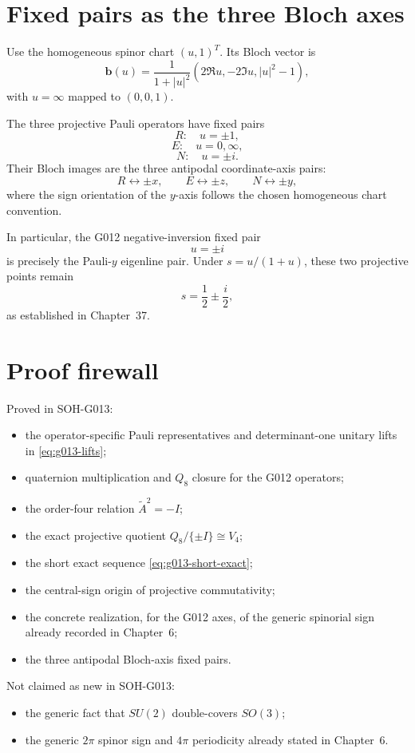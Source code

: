\section{Fixed pairs as the three Bloch axes}

Use the homogeneous spinor chart \((u,1)^T\).  Its Bloch vector is
\[
 \mathbf b(u)
 =\frac{1}{1+|u|^2}
 \left(
 2\Re u,
 -2\Im u,
 |u|^2-1
 \right),
\]
with \(u=\infty\) mapped to \((0,0,1)\).

The three projective Pauli operators have fixed pairs
\[
 R:\quad u=\pm1,
\]
\[
 E:\quad u=0,\infty,
\]
\[
 N:\quad u=\pm i.
\]
Their Bloch images are the three antipodal coordinate-axis pairs:
\[
 R\leftrightarrow\pm x,
 \qquad
 E\leftrightarrow\pm z,
 \qquad
 N\leftrightarrow\pm y,
\]
where the sign orientation of the \(y\)-axis follows the chosen homogeneous
chart convention.

In particular, the G012 negative-inversion fixed pair
\[
 u=\pm i
\]
is precisely the Pauli-\(y\) eigenline pair.  Under
\(s=u/(1+u)\), these two projective points remain
\[
 \boxed{s=\frac12\pm\frac{i}{2}},
\]
as established in Chapter~37.

\section{Proof firewall}

Proved in SOH-G013:
\begin{itemize}
 \item the operator-specific Pauli representatives and determinant-one unitary
       lifts in \cref{eq:g013-lifts};
 \item quaternion multiplication and \(Q_8\) closure for the G012 operators;
 \item the order-four relation \(\widetilde A^2=-I\);
 \item the exact projective quotient
       \(Q_8/\{\pm I\}\cong V_4\);
 \item the short exact sequence \cref{eq:g013-short-exact};
 \item the central-sign origin of projective commutativity;
 \item the concrete realization, for the G012 axes, of the generic spinorial
       sign already recorded in Chapter~6;
 \item the three antipodal Bloch-axis fixed pairs.
\end{itemize}

Not claimed as new in SOH-G013:
\begin{itemize}
 \item the generic fact that \(SU(2)\) double-covers \(SO(3)\);
 \item the generic \(2\pi\) spinor sign and \(4\pi\) periodicity already stated
       in Chapter~6.
\end{itemize}

